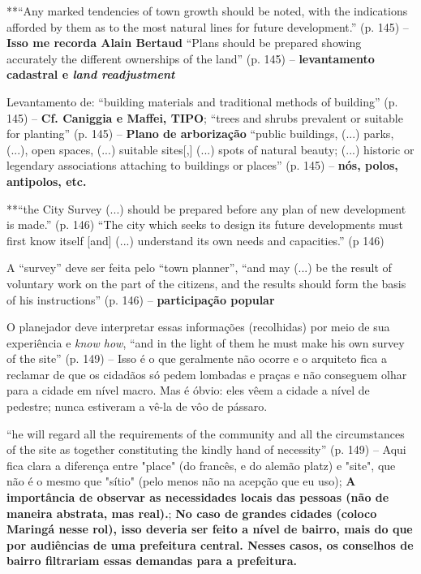 \documentclass[12pt, a4paper]{book} %
\begin{document}
        **``Any marked tendencies of town growth should be noted, with the indications afforded by them as to the most natural lines for future development.'' (p. 145) – \textbf{Isso me recorda Alain Bertaud}
        ``Plans should be prepared showing accurately the different ownerships of the land'' (p. 145) – \textbf{levantamento cadastral e \textit{land readjustment}}

        Levantamento de: ``building materials and traditional methods of building'' (p. 145) – \textbf{Cf. Caniggia e Maffei, TIPO}; 
        ``trees and shrubs prevalent or suitable for planting'' (p. 145) – \textbf{Plano de arborização}
        ``public buildings, (...) parks, (...), open spaces, (...) suitable sites[,] (...) spots of natural beauty; (...) historic or legendary associations attaching to buildings or places'' (p. 145) – \textbf{nós, polos, antipolos, etc.}

        **``the City Survey (...) should be prepared before any plan of new development is made.'' (p. 146)
        ``The city which seeks to design its future developments must first know itself [and] (...) understand its own needs and capacities.'' (p 146)

        A ``survey'' deve ser feita pelo ``town planner'', ``and may (...) be the result of voluntary work on the part of the citizens, and the results should form the basis of his instructions'' (p. 146) – \textbf{participação popular}

        O planejador deve interpretar essas informações (recolhidas) por meio de sua experiência e \textit{know how}, ``and in the light of them he must make his own survey of the site'' (p. 149) – Isso é o que geralmente não ocorre e o arquiteto fica a reclamar de que os cidadãos só pedem lombadas e praças e não conseguem olhar para a cidade em nível macro. Mas é óbvio: eles vêem a cidade a nível de pedestre; nunca estiveram a vê-la de vôo de pássaro.

        ``he will regard all the requirements of the community and all the circumstances of the site as together constituting the kindly hand of necessity'' (p. 149) – Aqui fica clara a diferença entre "place" (do francês, e do alemão platz) e "site", que não é o mesmo que "sítio" (pelo menos não na acepção que eu uso); \textbf{A importância de observar as necessidades locais das pessoas (não de maneira abstrata, mas real).}; \textbf{No caso de grandes cidades (coloco Maringá nesse rol), isso deveria ser feito a nível de bairro, mais do que por audiências de uma prefeitura central. Nesses casos, os conselhos de bairro filtrariam essas demandas para a prefeitura.}
\end{document}
